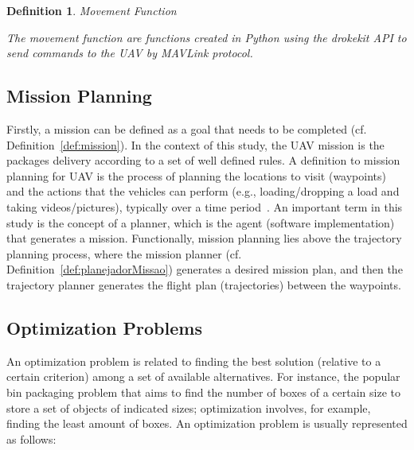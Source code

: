 \documentclass[conference,harvard,brazil,english]{sbatex}
\newtheorem{myDefinition}{Definition}
\begin{document}
\begin{myDefinition}{Movement Function}

The movement function are functions created in Python using the drokekit API to send commands to the UAV by MAVLink protocol.
\label{def:movFunc}
\end{myDefinition}


\subsection{Mission Planning}
\label{subsec:missionplanning}

Firstly, a mission can be defined as a goal that needs to be completed (cf. Definition~\ref{def:mission}). In the context of this study, the UAV mission is the packages delivery according to a set of well defined rules. A definition to mission planning for UAV is the process of planning the locations to visit (waypoints) and the actions that the vehicles can perform (e.g., loading/dropping a load and taking videos/pictures), typically over a time period~\cite{ramirez2014solving}. An important term in this study is the concept of a planner, which is the agent (software implementation) that generates a mission. Functionally, mission planning lies above the trajectory planning process, where the mission planner (cf. Definition~\ref{def:planejadorMissao}) generates a desired mission plan, and then the trajectory planner generates the flight plan (trajectories) between the waypoints.




\subsection{Optimization Problems}

An optimization problem is related to finding the best solution (relative to a certain criterion) among a set of available alternatives. For instance, the popular bin packaging problem that aims to find the number of boxes of a certain size to store a set of objects of indicated sizes; optimization involves, for example, finding the least amount of boxes. An optimization problem is usually represented as follows:
\end{document}
